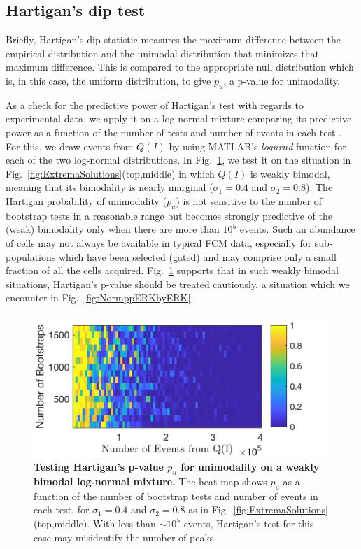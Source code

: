 \documentclass[11pt,a4paper,final]{article}
\begin{document}
\subsection*{Hartigan's dip test}
Briefly, Hartigan's dip statistic measures the maximum difference between the empirical distribution and the unimodal distribution that minimizes that maximum difference. This is compared to the appropriate null distribution which is, in this case, the uniform distribution, to give $p_u$, a p-value for unimodality.

As a check for the predictive power of Hartigan's test with regards to experimental data, we apply it on a log-normal mixture comparing its predictive power as a function of the number of tests and number of events in each test \cite{NicPrice}. For this, we draw events from $Q(I)$ by using MATLAB's \emph{lognrnd} function for each of the two log-normal distributions. In Fig.~\ref{fig:CheckHartigan}, we test it on the situation in Fig.~\ref{fig:ExtremaSolutions}(top,middle) in which $Q(I)$ is weakly bimodal, meaning that its bimodality is nearly marginal ($\sigma_1=0.4$ and $\sigma_2=0.8$). The Hartigan probability of unimodality ($p_u$) is not sensitive to the number of bootstrap tests in a reasonable range but becomes strongly predictive of the (weak) bimodality only when there are more than $10^5$ events. Such an abundance of cells may not always be available in typical FCM data, especially for sub-populations which have been selected (gated) and may comprise only a small fraction of all the cells acquired. Fig.~\ref{fig:CheckHartigan} supports that in such weakly bimodal situations, Hartigan's p-value should be treated cautiously, a situation which we encounter in Fig.~\ref{fig:NormppERKbyERK}. \smallskip

\begin{figure}[!ht]
 \centering
 \includegraphics[clip,width=1\hsize]{Fig6.png}
  \caption{\textbf{Testing Hartigan's p-value $p_u$ for unimodality on a weakly bimodal log-normal mixture.} The heat-map shows $p_u$ as a function of the number of bootstrap tests and number of events in each test, for $\sigma_1=0.4$ and $\sigma_2=0.8$ as in Fig.~\ref{fig:ExtremaSolutions}(top,middle). With less than $\sim10^5$ events, Hartigan's test for this case may misidentify the number of peaks.}
  \label{fig:CheckHartigan}
\end{figure}
\end{document}
